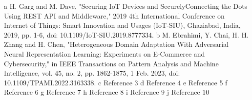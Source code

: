 \documentclass[12pt,a4paper,titlepage]{report}
\begin{document}
	\begin{thebibliography}{99}
	\bibitem a H. Garg and M. Dave, "Securing IoT Devices and SecurelyConnecting the Dots Using REST API and Middleware," 2019 4th International Conference on Internet of Things: Smart Innovation and Usages (IoT-SIU), Ghaziabad, India, 2019, pp. 1-6, doi: 10.1109/IoT-SIU.2019.8777334.
	\bibitem b M. Ebrahimi, Y. Chai, H. H. Zhang and H. Chen, "Heterogeneous Domain Adaptation With Adversarial Neural Representation Learning: Experiments on E-Commerce and Cybersecurity," in IEEE Transactions on Pattern Analysis and Machine Intelligence, vol. 45, no. 2, pp. 1862-1875, 1 Feb. 2023, doi: 10.1109/TPAMI.2022.3163338.
	\bibitem c Reference 3
	\bibitem d Reference 4
	\bibitem e Reference 5
	\bibitem f Reference 6
	\bibitem g Reference 7
	\bibitem h Reference 8
	\bibitem i Reference 9
	\bibitem j Reference 10
	
	\end{thebibliography}
	
	
%	
	
	
\end{document}
